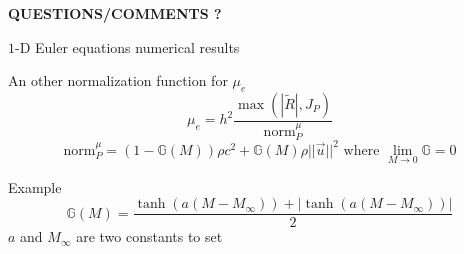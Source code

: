 \documentclass[xcolor=dvipsnames,10pt]{beamer}
\newcommand{\resi}{R}
\newcommand{\resinew}{\widetilde{\resi}}
\newcommand{\norm}{\textrm{norm}}
\begin{document}
\begin{frame}{}
\begin{center}
\LARGE{\textbf{QUESTIONS/COMMENTS ?}}
\end{center}
\end{frame}
\begin{frame}{}
\begin{center}
$1$-D Euler equations numerical results
\end{center}
\end{frame}
\begin{frame}{}
\begin{block}{An other normalization function for $\mu_e$}
\begin{equation}
\mu_e = h^2 \frac{\max \left( |\resinew|, J_P \right)}{\norm_P^\mu} \nonumber
\end{equation}
\begin{equation}
\norm_P^\mu = (1 - \mathbb{G}(M) ) \rho c^2 + \mathbb{G}(M) \rho || \vec{u} ||^2 \text{ where } \lim_{M\to 0} \mathbb{G} = 0\nonumber
\end{equation}
\end{block}
\begin{block}{Example}
\begin{equation}
\mathbb{G}(M) = \frac{\tanh (a(M-M_\infty)) + |\tanh (a(M-M_\infty))|}{2} \nonumber
\end{equation}
$a$ and $M_\infty$ are two constants to set
\end{block}
\end{frame}
\end{document}
